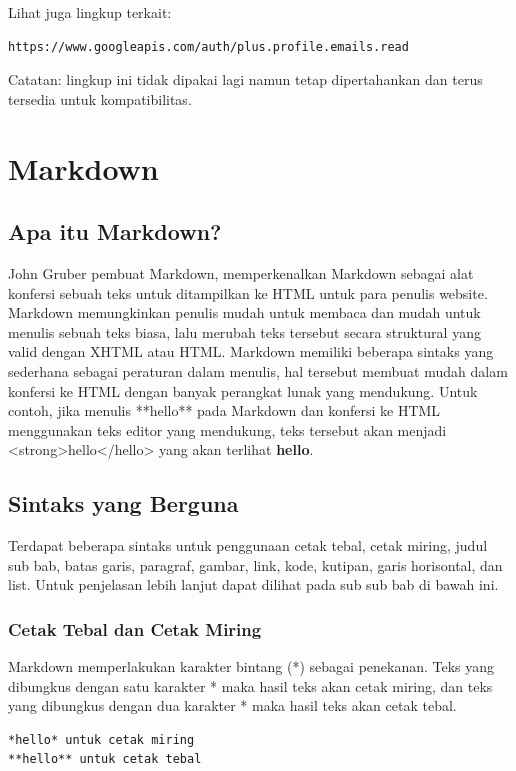 Lihat juga lingkup terkait:
\begin{lstlisting}
https://www.googleapis.com/auth/plus.profile.emails.read
\end{lstlisting}

Catatan: lingkup ini tidak dipakai lagi namun tetap dipertahankan dan terus tersedia untuk kompatibilitas.

\section{Markdown}
\label{sec:markdown}

\subsection{Apa itu Markdown? \cite{Markguide:2015}}
John Gruber pembuat Markdown, memperkenalkan Markdown sebagai alat konfersi sebuah teks untuk ditampilkan ke HTML untuk para penulis website. Markdown memungkinkan penulis mudah untuk membaca dan mudah untuk menulis sebuah teks biasa, lalu merubah teks tersebut secara struktural yang valid dengan XHTML atau HTML.
Markdown memiliki beberapa sintaks yang sederhana sebagai peraturan dalam menulis, hal tersebut membuat mudah dalam konfersi ke HTML dengan banyak perangkat lunak yang mendukung.
Untuk contoh, jika menulis **hello** pada Markdown dan konfersi ke HTML menggunakan teks editor yang mendukung, teks tersebut akan menjadi <strong>hello</hello> yang akan terlihat \textbf{hello}.

\subsection{Sintaks yang Berguna \cite{Markguide:2015}}
Terdapat beberapa sintaks untuk penggunaan cetak tebal, cetak miring, judul sub bab, batas garis, paragraf, gambar, link, kode, kutipan, garis horisontal, dan list. Untuk penjelasan lebih lanjut dapat dilihat pada sub sub bab di bawah ini.

\subsubsection{Cetak Tebal dan Cetak Miring}
Markdown memperlakukan karakter bintang (*) sebagai penekanan. Teks yang dibungkus dengan satu karakter * maka hasil teks akan cetak miring, dan teks yang dibungkus dengan dua karakter * maka hasil teks akan cetak tebal.
\begin{lstlisting}
*hello* untuk cetak miring
**hello** untuk cetak tebal
\end{lstlisting}

